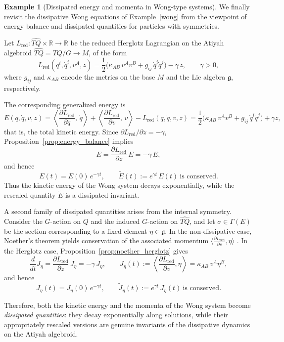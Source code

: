 \documentclass[11pt,a4paper]{article}
\theoremstyle{definition}
\newtheorem{example}[theorem]{Example}
\begin{document}
\begin{example}[Dissipated energy and momenta in Wong-type systems]
We finally revisit the dissipative Wong equations of
Example~\ref{wong} from the viewpoint of
energy balance and dissipated quantities for particles with  symmetries.

Let $L_{\mathrm{red}} \colon \widehat{TQ}\times\mathbb{R}\to\mathbb{R}$
be the reduced Herglotz Lagrangian on the Atiyah algebroid
$\widehat{TQ}=TQ/G \to M$, of the form
\[
L_{\mathrm{red}}(q^i,\dot q^i,v^A,z)
= \frac{1}{2}\big(
\kappa_{AB}\,v^A v^B + g_{ij}\,\dot q^i \dot q^j\big) - \gamma\,z,
\qquad \gamma>0,
\]
where $g_{ij}$ and $\kappa_{AB}$ encode the metrics on the base $M$ and the
Lie algebra $\mathfrak{g}$, respectively.

The corresponding generalized energy is
\[
E(q,\dot q,v,z)
= \left\langle \frac{\partial L_{\mathrm{red}}}{\partial \dot q},\,\dot q\right\rangle
+ \left\langle \frac{\partial L_{\mathrm{red}}}{\partial v},\,v\right\rangle
- L_{\mathrm{red}}(q,\dot q,v,z)
= \frac{1}{2}\big(
\kappa_{AB}\,v^A v^B + g_{ij}\,\dot q^i \dot q^j\big) + \gamma z,
\]
that is, the total kinetic energy. Since $\partial L_{\mathrm{red}}/\partial z = -\gamma$,
Proposition~\ref{prop:energy_balance} implies
\[
\dot E = \frac{\partial L_{\mathrm{red}}}{\partial z}\,E = -\gamma\,E,
\]
and hence
\[
E(t) = E(0)\,e^{-\gamma t},
\qquad
\widetilde E(t) := e^{\gamma t}\,E(t)
\ \text{is conserved}.
\]
Thus the kinetic energy of the Wong system decays exponentially, while the
rescaled quantity $\widetilde E$ is a dissipated invariant.

A second family of dissipated quantities arises from the internal
symmetry. Consider the $G$-action on $Q$ and the induced $G$-action on
$\widehat{TQ}$, and let $\sigma\in\Gamma(E)$ be the section corresponding
to a fixed element $\eta\in\mathfrak{g}$. In the non-dissipative case,
Noether's theorem yields conservation of the associated momentum
$\langle \frac{\partial L_{\mathrm{red}}}{\partial v},\eta\rangle$ \cite{cendra2001lagrangian}.
In the Herglotz case, Proposition~\ref{prop:noether_herglotz} gives
\[
\frac{d}{dt} J_\eta
= \frac{\partial L_{\mathrm{red}}}{\partial z}\,J_\eta
= -\gamma\,J_\eta,
\qquad
J_\eta(t) := \left\langle \frac{\partial L_{\mathrm{red}}}{\partial v},
\eta\right\rangle = \kappa_{AB}\,v^A \eta^B,
\]
and hence
\[
J_\eta(t) = J_\eta(0)\,e^{-\gamma t},
\qquad
\widetilde J_\eta(t) := e^{\gamma t}\,J_\eta(t)
\ \text{is conserved}.
\]

Therefore, both the kinetic energy and the momenta of the Wong system
become \emph{dissipated quantities}: they decay exponentially along solutions,
while their appropriately rescaled versions are genuine invariants of the
dissipative dynamics on the Atiyah algebroid.
\end{example}
\end{document}
